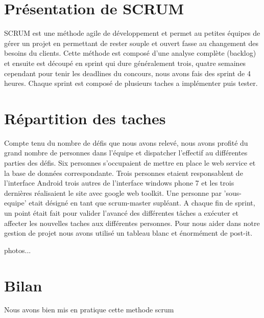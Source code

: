 \documentclass[a4paper,francais,titlepage]{report}
\begin{document}
\section{Présentation de SCRUM}
SCRUM est une méthode agile de développement et permet au petites équipes de gérer un projet en permettant de rester souple et ouvert fasse au changement des besoins du clients. Cette méthode est composé d'une analyse complète (backlog) et ensuite est découpé en sprint qui dure généralement trois, quatre semaines cependant pour tenir les deadlines du concours, nous avons fais des sprint de 4 heures. Chaque sprint est composé de plusieurs taches a implémenter puis tester.
\section{Répartition des taches}
Compte tenu du nombre de défis que nous avons relevé, nous avons profité du grand nombre de personnes dans l'équipe et dispatcher l'effectif au différentes parties des défis. Six personnes s'occupaient de mettre en place le web service et la base de données correspondante. Trois personnes etaient responsablent de l'interface Android trois autres de l'interface windows phone 7 et les trois dernières réalisaient le site avec google web toolkit. Une personne par 'sous-equipe' etait désigné en tant que scrum-master supléant. A chaque fin de sprint, un point était fait pour valider l'avancé des différentes tâches a exécuter et affecter les nouvelles taches aux différentes personnes.
Pour nous aider dans notre gestion de projet nous avons utilisé un tableau blanc et énormément de post-it.

photos...

\section{Bilan}
Nous avons bien mis en pratique cette methode scrum 
\end{document}
